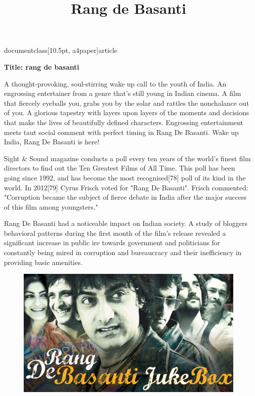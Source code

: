 documentclass[10.5pt, a4paper]{article}
\usepackage{amsfonts}
\usepackage[top=1in,left=1in,right=1in]{geometry}
\usepackage{times}
\usepackage{tabularx}
\usepackage{graphicx}
\title{Rang de Basanti}

\maketitle
\textbf{Title: rang de basanti}

A thought-provoking, soul-stirring wake up call to the youth of India. An engrossing entertainer from a genre
 that's still young in Indian cinema. A film that fiercely eyeballs you, grabs you by the solar and rattles the
 nonchalance out of you. A glorious tapestry with layers upon layers of the moments and decisions that make the
 lives of beautifully defined characters. Engrossing entertainment meets taut social comment with perfect timing
 in Rang De Basanti. Wake up India, Rang De Basanti is here!

Sight & Sound magazine conducts a poll every ten years of the world's finest film directors to find out the Ten Greatest Films of All Time. This poll has been going since 1992, and has become the most recognised[78] poll of its kind in the world. In 2012[79] Cyrus Frisch voted for "Rang De Basanti". Frisch commented: "Corruption became the subject of fierce debate in India after the major success of this film among youngsters."

Rang De Basanti had a noticeable impact on Indian society. A study of bloggers behavioral patterns during the first month of the film's release revealed a significant increase in public ire towards government and politicians for constantly being mired in corruption and bureaucracy and their inefficiency in providing basic amenities. 


\begin{figure}
\includegraphics{pic.jpg}
\end{figure}

